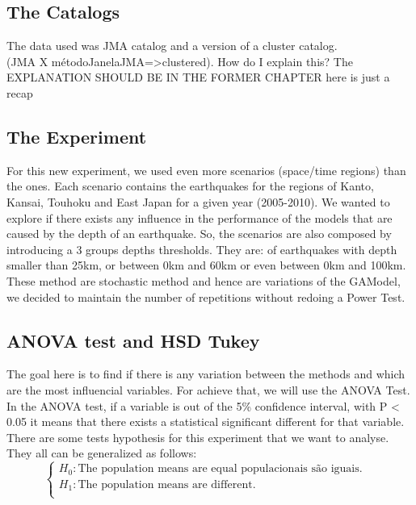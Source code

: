 \subsection{The Catalogs}

The data used was JMA catalog and a version of a cluster catalog.\\ 
(JMA X métodoJanelaJMA=>clustered). How do I explain this? The EXPLANATION SHOULD BE IN THE FORMER CHAPTER
here is just a recap
\subsection{The Experiment}
For this new experiment, we used even more scenarios (space/time regions) than the ones. Each scenario contains the earthquakes for the regions of Kanto, Kansai, Touhoku and East Japan for a given year (2005-2010). We wanted to explore if there exists any influence in the performance of the models that are caused by the depth of an earthquake. So, the scenarios are also composed by introducing a 3 groups depths thresholds. They are: of earthquakes with depth smaller than 25km, or between 0km and 60km or even between 0km and 100km.\\

These method are stochastic method and hence are variations of the GAModel, we decided to maintain the number of repetitions without redoing a Power Test.\\

\subsection{ANOVA test and HSD Tukey}

The goal here is to find if there is any variation between the methods and which are the most influencial variables. For achieve that, we will use the ANOVA Test.\\

In the ANOVA test, if a variable is out of the 5\% confidence interval, with P < 0.05 it means that there exists a statistical significant different for that variable.\\

There are some tests hypothesis for this experiment that we want to analyse. They all can be generalized as follows:\\

$$\begin{cases} H_0: \text{The population means are equal populacionais são iguais.} &\\
H_1: \text{The population means are different.}&\\
\end{cases}$$\\

